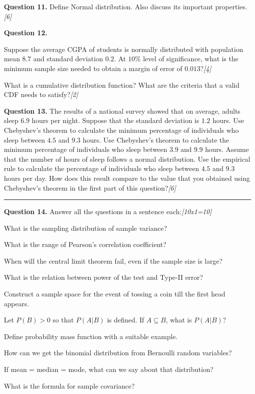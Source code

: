 \documentclass[11pt,a4paper]{article}
\newcommand{\pts}[1]{\hfill   \textit{[#1]}}
\begin{document}
\medskip


\noindent   \textbf{Question 11.} Define Normal distribution. Also discuss its important properties.\pts{6}

\medskip


\noindent   \textbf{Question 12.}

\begin{parts}
  \item Suppose the average CGPA of students is normally distributed with population mean $8.7$ and standard deviation $0.2$. At $10\%$ level of significance, what is the minimum sample size needed to obtain a margin of error of $0.013$?\pts{4}
  \item What is a cumulative distribution function? What are the criteria that a valid CDF needs to satisfy?\pts{2}
\end{parts}

\medskip


\noindent   \textbf{Question 13.} The results of a national survey showed that on average, adults sleep $6.9$ hours per night. Suppose that the standard deviation is $1.2$ hours. Use Chebyshev's theorem to calculate the minimum percentage of individuals who sleep between $4.5$ and $9.3$ hours. Use Chebyshev's theorem to calculate the minimum percentage of individuals who sleep between $3.9$ and $9.9$ hours. Assume that the number of hours of sleep follows a normal distribution. Use the empirical rule to calculate the percentage of individuals who sleep between $4.5$ and $9.3$ hours per day. How does this result compare to the value that you obtained using Chebyshev's theorem in the first part of this question?\pts{6}

\bigskip


\rule{\linewidth}{0.4pt}\smallskip

\medskip


\noindent   \textbf{Question 14.} Answer all the questions in a sentence each:\pts{10x1=10}

\begin{parts}
  \item What is the sampling distribution of sample variance?
  \item What is the range of Pearson's correlation coefficient?
  \item When will the central limit theorem fail, even if the sample size is large?
  \item What is the relation between power of the test and Type-II error?
  \item Construct a sample space for the event of tossing a coin till the first head appears.
  \item Let $P(B) > 0$ so that $P(A|B)$ is defined. If $A \subseteq B$, what is $P(A|B)$?
  \item Define probability mass function with a suitable example.
  \item How can we get the binomial distribution from Bernoulli random variables?
  \item If mean = median = mode, what can we say about that distribution?
  \item What is the formula for sample covariance?
\end{parts}
\end{document}
